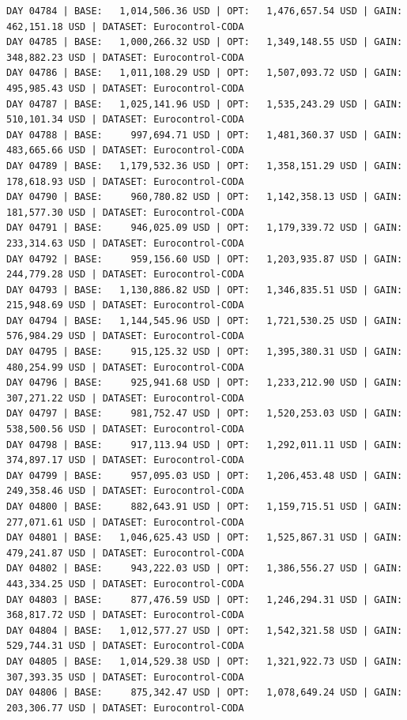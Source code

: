 \documentclass[11pt,a4paper]{article}
\begin{document}
\begin{verbatim}
DAY 04784 | BASE:   1,014,506.36 USD | OPT:   1,476,657.54 USD | GAIN: 462,151.18 USD | DATASET: Eurocontrol-CODA
DAY 04785 | BASE:   1,000,266.32 USD | OPT:   1,349,148.55 USD | GAIN: 348,882.23 USD | DATASET: Eurocontrol-CODA
DAY 04786 | BASE:   1,011,108.29 USD | OPT:   1,507,093.72 USD | GAIN: 495,985.43 USD | DATASET: Eurocontrol-CODA
DAY 04787 | BASE:   1,025,141.96 USD | OPT:   1,535,243.29 USD | GAIN: 510,101.34 USD | DATASET: Eurocontrol-CODA
DAY 04788 | BASE:     997,694.71 USD | OPT:   1,481,360.37 USD | GAIN: 483,665.66 USD | DATASET: Eurocontrol-CODA
DAY 04789 | BASE:   1,179,532.36 USD | OPT:   1,358,151.29 USD | GAIN: 178,618.93 USD | DATASET: Eurocontrol-CODA
DAY 04790 | BASE:     960,780.82 USD | OPT:   1,142,358.13 USD | GAIN: 181,577.30 USD | DATASET: Eurocontrol-CODA
DAY 04791 | BASE:     946,025.09 USD | OPT:   1,179,339.72 USD | GAIN: 233,314.63 USD | DATASET: Eurocontrol-CODA
DAY 04792 | BASE:     959,156.60 USD | OPT:   1,203,935.87 USD | GAIN: 244,779.28 USD | DATASET: Eurocontrol-CODA
DAY 04793 | BASE:   1,130,886.82 USD | OPT:   1,346,835.51 USD | GAIN: 215,948.69 USD | DATASET: Eurocontrol-CODA
DAY 04794 | BASE:   1,144,545.96 USD | OPT:   1,721,530.25 USD | GAIN: 576,984.29 USD | DATASET: Eurocontrol-CODA
DAY 04795 | BASE:     915,125.32 USD | OPT:   1,395,380.31 USD | GAIN: 480,254.99 USD | DATASET: Eurocontrol-CODA
DAY 04796 | BASE:     925,941.68 USD | OPT:   1,233,212.90 USD | GAIN: 307,271.22 USD | DATASET: Eurocontrol-CODA
DAY 04797 | BASE:     981,752.47 USD | OPT:   1,520,253.03 USD | GAIN: 538,500.56 USD | DATASET: Eurocontrol-CODA
DAY 04798 | BASE:     917,113.94 USD | OPT:   1,292,011.11 USD | GAIN: 374,897.17 USD | DATASET: Eurocontrol-CODA
DAY 04799 | BASE:     957,095.03 USD | OPT:   1,206,453.48 USD | GAIN: 249,358.46 USD | DATASET: Eurocontrol-CODA
DAY 04800 | BASE:     882,643.91 USD | OPT:   1,159,715.51 USD | GAIN: 277,071.61 USD | DATASET: Eurocontrol-CODA
DAY 04801 | BASE:   1,046,625.43 USD | OPT:   1,525,867.31 USD | GAIN: 479,241.87 USD | DATASET: Eurocontrol-CODA
DAY 04802 | BASE:     943,222.03 USD | OPT:   1,386,556.27 USD | GAIN: 443,334.25 USD | DATASET: Eurocontrol-CODA
DAY 04803 | BASE:     877,476.59 USD | OPT:   1,246,294.31 USD | GAIN: 368,817.72 USD | DATASET: Eurocontrol-CODA
DAY 04804 | BASE:   1,012,577.27 USD | OPT:   1,542,321.58 USD | GAIN: 529,744.31 USD | DATASET: Eurocontrol-CODA
DAY 04805 | BASE:   1,014,529.38 USD | OPT:   1,321,922.73 USD | GAIN: 307,393.35 USD | DATASET: Eurocontrol-CODA
DAY 04806 | BASE:     875,342.47 USD | OPT:   1,078,649.24 USD | GAIN: 203,306.77 USD | DATASET: Eurocontrol-CODA

\end{verbatim}
\end{document}
